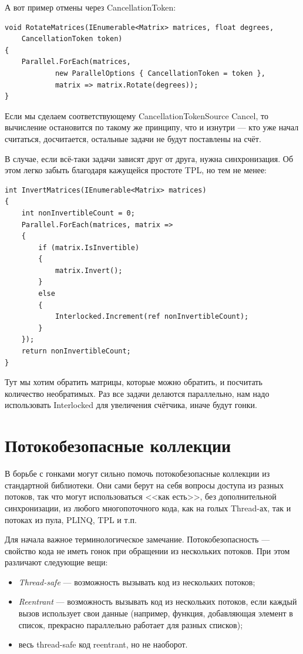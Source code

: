\documentclass{../../text-style}
\begin{document}
А вот пример отмены через CancellationToken:

\begin{verbatim}
void RotateMatrices(IEnumerable<Matrix> matrices, float degrees,
    CancellationToken token)
{
    Parallel.ForEach(matrices,
            new ParallelOptions { CancellationToken = token },
            matrix => matrix.Rotate(degrees));
}
\end{verbatim}

Если мы сделаем соответствующему CancellationTokenSource Cancel, то вычисление остановится по такому же принципу, что и изнутри --- кто уже начал считаться, досчитается, остальные задачи не будут поставлены на счёт.

В случае, если всё-таки задачи зависят друг от друга, нужна синхронизация. Об этом легко забыть благодаря кажущейся простоте TPL, но тем не менее:

\begin{verbatim}
int InvertMatrices(IEnumerable<Matrix> matrices)
{
    int nonInvertibleCount = 0;
    Parallel.ForEach(matrices, matrix =>
    {
        if (matrix.IsInvertible) 
        {
            matrix.Invert();
        } 
        else 
        {
            Interlocked.Increment(ref nonInvertibleCount);
        }
    });
    return nonInvertibleCount;
}
\end{verbatim}

Тут мы хотим обратить матрицы, которые можно обратить, и посчитать количество необратимых. Раз все задачи делаются параллельно, нам надо использовать Interlocked для увеличения счётчика, иначе будут гонки.

\section{Потокобезопасные коллекции}

В борьбе с гонками могут сильно помочь потокобезопасные коллекции из стандартной библиотеки. Они сами берут на себя вопросы доступа из разных потоков, так что могут использоваться <<как есть>>, без дополнительной синхронизации, из любого многопоточного кода, как на голых Thread-ах, так и потоках из пула, PLINQ, TPL и т.п. 

Для начала важное терминологическое замечание. Потокобезопасность --- свойство кода не иметь гонок при обращении из нескольких потоков. При этом различают следующие вещи:
\begin{itemize}
    \item \textit{Thread-safe} --- возможность вызывать код из нескольких потоков;
    \item \textit{Reentrant} --- возможность вызывать код из нескольких потоков, если каждый вызов использует свои данные (например, функция, добавляющая элемент в список, прекрасно параллельно работает для разных списков);
    \item весь thread-safe код reentrant, но не наоборот.
\end{itemize}
\end{document}

